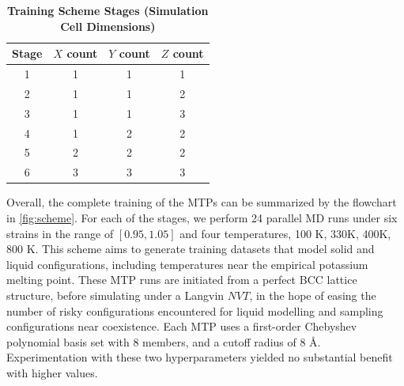 \documentclass[9pt,twocolumn,twoside]{opticajnl}
\begin{document}
\begin{table}[htbp]
  \centering
  \caption{\bf Training Scheme Stages (Simulation Cell Dimensions)}
  \begin{tabular}{cccc}
  \hline
  Stage & $X$ count & $Y$ count & $Z$ count\\
  \hline
  1 & 1 & 1 & 1\\
  2 & 1 & 1 & 2\\
  3 & 1 & 1 & 3\\
  4 & 1 & 2 & 2\\
  5 & 2 & 2 & 2\\
  6 & 3 & 3 & 3\\
  \hline
  \end{tabular}
  \label{tab:stages}
\end{table}

Overall, the complete training of the MTPs can be summarized by the flowchart in \ref{fig:scheme}. For each of the stages, we perform 24 parallel MD runs under six strains in the range of $[0.95, 1.05]$ and four temperatures, 100 K, 330K, 400K, 800 K. This scheme aims to generate training datasets that model solid and liquid configurations, including temperatures near the empirical potassium melting point. These MTP runs are initiated from a perfect BCC lattice structure, before simulating under a Langvin $NVT$, in the hope of easing the number of risky configurations encountered for liquid modelling and sampling configurations near coexistence. Each MTP uses a first-order Chebyshev polynomial basis set with 8 members, and a cutoff radius of 8 Å. Experimentation with these two hyperparameters yielded no substantial benefit with higher values.  
\end{document}
